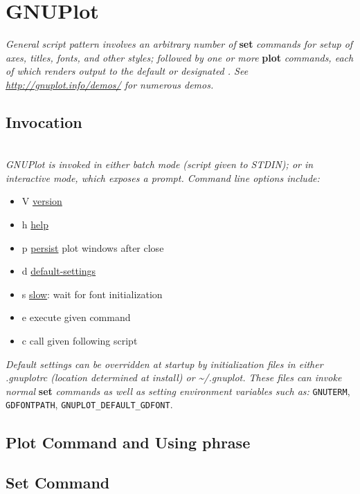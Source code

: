 \section{GNUPlot}
\textit{General script pattern involves an arbitrary number of }\textbf{set}\textit{ commands for setup of axes, titles, fonts, and other styles; followed by one or more }\textbf{plot}\textit{ commands, each of which renders output to the default or designated . See \href{here}{http://gnuplot.info/demos/} for numerous demos.}


\subsection*{Invocation}
\\
\textit{GNUPlot is invoked in either batch mode (script given to STDIN); or in interactive mode, which exposes a prompt. Command line options include:}\
\begin{itemize}[label=-]
    \item V \quad \ul{version}
    \item h \quad \ul{help}
    \item p \quad \ul{persist} plot windows after close 
    \item d \quad \ul{default-settings}
    \item s \quad \ul{slow}: wait for font initialization
    \item e \quad execute given command
    \item c \quad call given following script
\end{itemize}
\textit{Default settings can be overridden at startup by initialization files in either .gnuplotrc (location determined at install) or \textasciitilde /.gnuplot. These files can invoke normal }\textbf{set}\textit{ commands as well as setting environment variables such as: } \texttt{GNUTERM}, \texttt{GDFONTPATH}, \texttt{GNUPLOT\_DEFAULT\_GDFONT}. \\


\subsection*{Plot Command and Using phrase}


\subsection*{Set Command}


